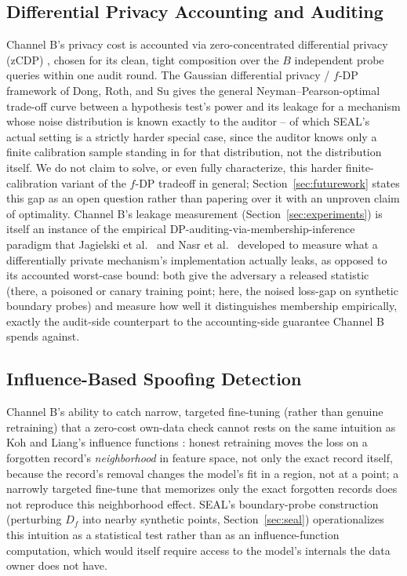 \documentclass[10pt,journal,compsoc]{IEEEtran}
\begin{document}
\subsection{Differential Privacy Accounting and Auditing}

Channel B's privacy cost is accounted via zero-concentrated differential privacy (zCDP) \cite{bun2016concentrated}, chosen for its clean, tight composition over the $B$ independent probe queries within one audit round. The Gaussian differential privacy / $f$-DP framework of Dong, Roth, and Su \cite{dong2022gdp} gives the general Neyman--Pearson-optimal trade-off curve between a hypothesis test's power and its leakage for a mechanism whose noise distribution is known exactly to the auditor -- of which SEAL's actual setting is a strictly harder special case, since the auditor knows only a finite calibration sample standing in for that distribution, not the distribution itself. We do not claim to solve, or even fully characterize, this harder finite-calibration variant of the $f$-DP tradeoff in general; Section~\ref{sec:futurework} states this gap as an open question rather than papering over it with an unproven claim of optimality. Channel B's leakage measurement (Section~\ref{sec:experiments}) is itself an instance of the empirical DP-auditing-via-membership-inference paradigm that Jagielski et al.\ \cite{jagielski2020auditing} and Nasr et al.\ \cite{nasr2021adversary} developed to measure what a differentially private mechanism's implementation actually leaks, as opposed to its accounted worst-case bound: both give the adversary a released statistic (there, a poisoned or canary training point; here, the noised loss-gap on synthetic boundary probes) and measure how well it distinguishes membership empirically, exactly the audit-side counterpart to the accounting-side guarantee Channel B spends against.

\subsection{Influence-Based Spoofing Detection}

Channel B's ability to catch narrow, targeted fine-tuning (rather than genuine retraining) that a zero-cost own-data check cannot rests on the same intuition as Koh and Liang's influence functions \cite{koh2017influence}: honest retraining moves the loss on a forgotten record's \emph{neighborhood} in feature space, not only the exact record itself, because the record's removal changes the model's fit in a region, not at a point; a narrowly targeted fine-tune that memorizes only the exact forgotten records does not reproduce this neighborhood effect. SEAL's boundary-probe construction (perturbing $D_f$ into nearby synthetic points, Section~\ref{sec:seal}) operationalizes this intuition as a statistical test rather than as an influence-function computation, which would itself require access to the model's internals the data owner does not have.
\end{document}
